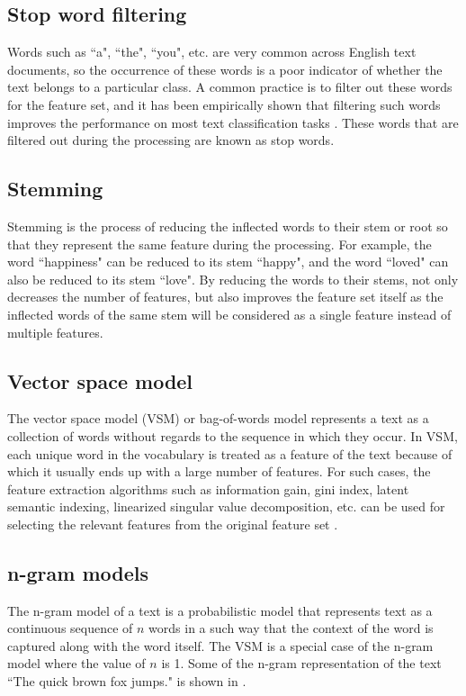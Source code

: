 \subsection{Stop word filtering}
Words such as ``a", ``the", ``you", etc. are very common across English text documents, so the occurrence of these words is a poor indicator of whether the text belongs to a particular class. A common practice is to filter out these words for the feature set, and it has been empirically shown that filtering such words improves the performance on most text classification tasks \cite{silva2003importance}. These words that are filtered out during the processing are known as stop words. 

\subsection{Stemming}
Stemming is the process of reducing the inflected words to their stem or root so that they represent the same feature during the processing. For example, the word ``happiness" can be reduced to its stem ``happy", and the word ``loved" can also be reduced to its stem ``love". By reducing the words to their stems, not only decreases the number of features, but also improves the feature set itself  as the inflected words of the same stem will be considered as a single feature instead of multiple features. 

\subsection{Vector space model}
The vector space model (VSM) or bag-of-words model represents a text as a collection of words without regards to the sequence in which they occur. In VSM, each unique word in the vocabulary is treated as a feature of the text because of which it usually ends up with a large number of features. For such cases, the feature extraction algorithms such as information gain, gini index, latent semantic indexing, linearized singular value decomposition, etc. can be used for selecting the relevant features from the original feature set \cite{aggarwal2012survey}.

\subsection{n-gram models}
The n-gram model of a text is a probabilistic model that represents text as a continuous sequence of $n$ words in a such way that the context of the word is captured along with the word itself. The VSM is a special case of the n-gram model where the value of $n$ is 1. Some of the n-gram representation of the text ``The quick brown fox jumps." is shown in .

